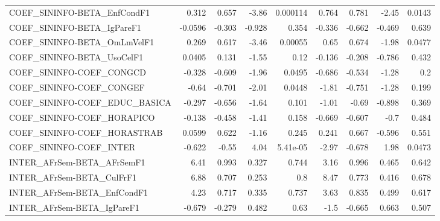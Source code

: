 \begin{tabular}{lrrrrrrrr}
COEF\_SININFO-BETA\_EnfCondF1           &       0.312 &        0.657 &   -3.86 & 0.000114 &      0.764 &       0.781 &        -2.45 &        0.0143 \\
COEF\_SININFO-BETA\_IgPareF1            &     -0.0596 &       -0.303 &  -0.928 &    0.354 &     -0.336 &      -0.662 &       -0.469 &         0.639 \\
COEF\_SININFO-BETA\_OmLmVelF1           &       0.269 &        0.617 &   -3.46 &  0.00055 &       0.65 &       0.674 &        -1.98 &        0.0477 \\
COEF\_SININFO-BETA\_UsoCelF1            &      0.0405 &        0.131 &   -1.55 &     0.12 &     -0.136 &      -0.208 &       -0.786 &         0.432 \\
COEF\_SININFO-COEF\_CONGCD              &      -0.328 &       -0.609 &   -1.96 &   0.0495 &     -0.686 &      -0.534 &        -1.28 &           0.2 \\
COEF\_SININFO-COEF\_CONGEF              &       -0.64 &       -0.701 &   -2.01 &   0.0448 &      -1.81 &      -0.751 &        -1.28 &         0.199 \\
COEF\_SININFO-COEF\_EDUC\_BASICA         &      -0.297 &       -0.656 &   -1.64 &    0.101 &      -1.01 &       -0.69 &       -0.898 &         0.369 \\
COEF\_SININFO-COEF\_HORAPICO            &      -0.138 &       -0.458 &   -1.41 &    0.158 &     -0.669 &      -0.607 &         -0.7 &         0.484 \\
COEF\_SININFO-COEF\_HORASTRAB           &      0.0599 &        0.622 &   -1.16 &    0.245 &      0.241 &       0.667 &       -0.596 &         0.551 \\
COEF\_SININFO-COEF\_INTER               &      -0.622 &        -0.55 &    4.04 & 5.41e-05 &      -2.97 &      -0.678 &         1.98 &        0.0473 \\
INTER\_AFrSem-BETA\_AFrSemF1            &        6.41 &        0.993 &   0.327 &    0.744 &       3.16 &       0.996 &        0.465 &         0.642 \\
INTER\_AFrSem-BETA\_CulFrF1             &        6.88 &        0.707 &   0.253 &      0.8 &       8.47 &       0.773 &        0.416 &         0.678 \\
INTER\_AFrSem-BETA\_EnfCondF1           &        4.23 &        0.717 &   0.335 &    0.737 &       3.63 &       0.835 &        0.499 &         0.617 \\
INTER\_AFrSem-BETA\_IgPareF1            &      -0.679 &       -0.279 &   0.482 &     0.63 &       -1.5 &      -0.665 &        0.663 &         0.507 \\

\end{tabular}
